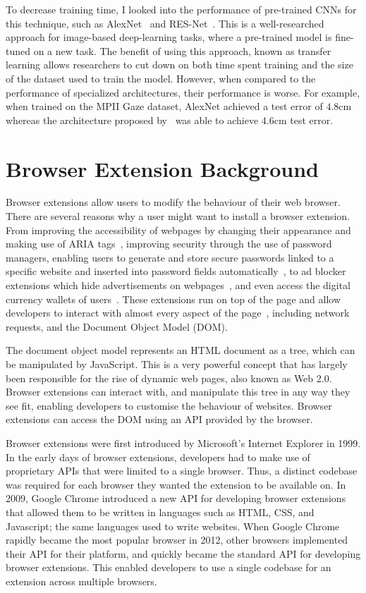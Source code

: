 \documentclass{report}
\begin{document}
To decrease training time, I looked into the performance of pre-trained CNNs for this technique, such as AlexNet~\cite{krizhevsky2017imagenet} and RES-Net~\cite{deng2009imagenet}. This is a well-researched approach for image-based deep-learning tasks, where a pre-trained model is fine-tuned on a new task. The benefit of using this approach, known as transfer learning allows researchers to cut down on both time spent training and the size of the dataset used to train the model. However, when compared to the performance of specialized architectures, their performance is worse. For example, when trained on the MPII Gaze dataset, AlexNet achieved a test error of \(4.8\text{cm}\) whereas the architecture proposed by~\textcite{akinyelu2020convolutional} was able to achieve \(4.6\text{cm}\) test error.

\section{Browser Extension Background}\label{sec:browser-extension-background}

Browser extensions allow users to modify the behaviour of their web browser. There are several reasons why a user might want to install a browser extension. From improving the accessibility of webpages by changing their appearance and making use of ARIA tags~\cite{w3c2018accessible,lsdsoftware2024read}, improving security through the use of password managers, enabling users to generate and store secure passwords linked to a specific website and inserted into password fields automatically~\cite{lastpass}, to ad blocker extensions which hide advertisements on webpages~\cite{hill2014ublock}, and even access the digital currency wallets of users~\cite{finlay2015metamask}. These extensions run on top of the page and allow developers to interact with almost every aspect of the page~\cite{frisbe2022building}, including network requests, and the Document Object Model (DOM).

The document object model represents an HTML document as a tree, which can be manipulated by JavaScript. This is a very powerful concept that has largely been responsible for the rise of dynamic web pages, also known as Web 2.0. Browser extensions can interact with, and manipulate this tree in any way they see fit, enabling developers to customise the behaviour of websites. Browser extensions can access the DOM using an API provided by the browser. 

Browser extensions were first introduced by Microsoft's Internet Explorer in 1999. In the early days of browser extensions, developers had to make use of proprietary APIs that were limited to a single browser. Thus, a distinct codebase was required for each browser they wanted the extension to be available on. In 2009, Google Chrome introduced a new API for developing browser extensions that allowed them to be written in languages such as HTML, CSS, and Javascript; the same languages used to write websites. When Google Chrome rapidly became the most popular browser in 2012, other browsers implemented their API for their platform, and quickly became the standard API for developing browser extensions. This enabled developers to use a single codebase for an extension across multiple browsers. 
\end{document}
